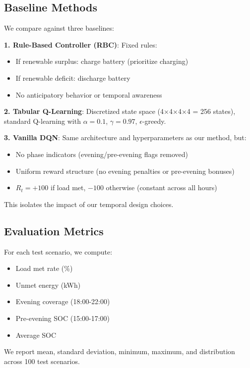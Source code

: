 \documentclass[11pt,a4paper]{article}
\begin{document}
\subsection{Baseline Methods}

We compare against three baselines:

\textbf{1. Rule-Based Controller (RBC)}: Fixed rules:
\begin{itemize}
    \item If renewable surplus: charge battery (prioritize charging)
    \item If renewable deficit: discharge battery
    \item No anticipatory behavior or temporal awareness
\end{itemize}

\textbf{2. Tabular Q-Learning}: Discretized state space (4$\times$4$\times$4$\times$4 = 256 states), standard Q-learning with $\alpha=0.1$, $\gamma=0.97$, $\epsilon$-greedy.

\textbf{3. Vanilla DQN}: Same architecture and hyperparameters as our method, but:
\begin{itemize}
    \item No phase indicators (evening/pre-evening flags removed)
    \item Uniform reward structure (no evening penalties or pre-evening bonuses)
    \item $R_t = +100$ if load met, $-100$ otherwise (constant across all hours)
\end{itemize}

This isolates the impact of our temporal design choices.

\subsection{Evaluation Metrics}

For each test scenario, we compute:
\begin{itemize}
    \item Load met rate (\%)
    \item Unmet energy (kWh)
    \item Evening coverage (18:00-22:00)
    \item Pre-evening SOC (15:00-17:00)
    \item Average SOC
\end{itemize}

We report mean, standard deviation, minimum, maximum, and distribution across 100 test scenarios.
\end{document}
